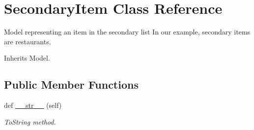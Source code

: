 \hypertarget{classjoinapp_1_1models_1_1items_1_1_secondary_item}{}\section{Secondary\+Item Class Reference}
\label{classjoinapp_1_1models_1_1items_1_1_secondary_item}


Model representing an item in the secondary list In our example, secondary items are restaurants.  




Inherits Model.

\subsection*{Public Member Functions}
\begin{DoxyCompactItemize}
\item 
def \mbox{\hyperlink{classjoinapp_1_1models_1_1items_1_1_secondary_item_a23e8041ce1015febe4fdace3225714f9}{\+\_\+\+\_\+str\+\_\+\+\_\+}} (self)
\begin{DoxyCompactList}\small\item\em To\+String method. \end{DoxyCompactList}\end{DoxyCompactItemize}
